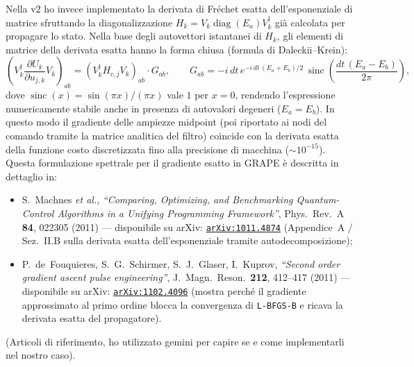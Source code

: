 \documentclass[11pt,a4paper]{article}
\begin{document}
\noindent
Nella v2 ho invece implementato la derivata di Fréchet esatta dell'esponenziale di matrice sfruttando la diagonalizzazione $H_k = V_k \operatorname{diag}(E_a) V_k^\dagger$ già calcolata per propagare lo stato. Nella base degli autovettori istantanei di $H_k$, gli elementi di matrice della derivata esatta hanno la forma chiusa (formula di Daleckii--Krein):
\begin{equation}
    \left(V_k^\dagger \frac{\partial U_k}{\partial u_{j,k}} V_k\right)_{ab} = \left(V_k^\dagger H_{c,j} V_k\right)_{ab} \cdot G_{ab}, \qquad
    G_{ab} = -i\,dt\,e^{-i\,dt\,(E_a + E_b)/2}\,\operatorname{sinc}\!\left(\frac{dt\,(E_a - E_b)}{2\pi}\right),
\end{equation}
dove $\operatorname{sinc}(x) = \sin(\pi x)/(\pi x)$ vale $1$ per $x=0$, rendendo l'espressione numericamente stabile anche in presenza di autovalori degeneri ($E_a = E_b$). In questo modo il gradiente delle ampiezze midpoint (poi riportato ai nodi del comando tramite la matrice analitica del filtro) coincide con la derivata esatta della funzione costo discretizzata fino alla precisione di macchina ($\sim 10^{-15}$). Questa formulazione spettrale per il gradiente esatto in GRAPE è descritta in dettaglio in:
\begin{itemize}
    \item S.~Machnes \emph{et al.}, \emph{``Comparing, Optimizing, and Benchmarking Quantum-Control Algorithms in a Unifying Programming Framework''}, Phys.\ Rev.\ A \textbf{84}, 022305 (2011) — disponibile su arXiv: \href{https://arxiv.org/abs/1011.4874}{\texttt{arXiv:1011.4874}} (Appendice~A / Sez.~II.B sulla derivata esatta dell'esponenziale tramite autodecomposizione);
    \item P.~de~Fouquieres, S.~G.~Schirmer, S.~J.~Glaser, I.~Kuprov, \emph{``Second order gradient ascent pulse engineering''}, J.\ Magn.\ Reson.\ \textbf{212}, 412--417 (2011) — disponibile su arXiv: \href{https://arxiv.org/abs/1102.4096}{\texttt{arXiv:1102.4096}} (mostra perché il gradiente approssimato al primo ordine blocca la convergenza di \texttt{L-BFGS-B} e ricava la derivata esatta del propagatore).
\end{itemize}

\noindent
(Articoli di riferimento, ho utilizzato gemini per capire se e come implementarli nel nostro caso).
\end{document}
